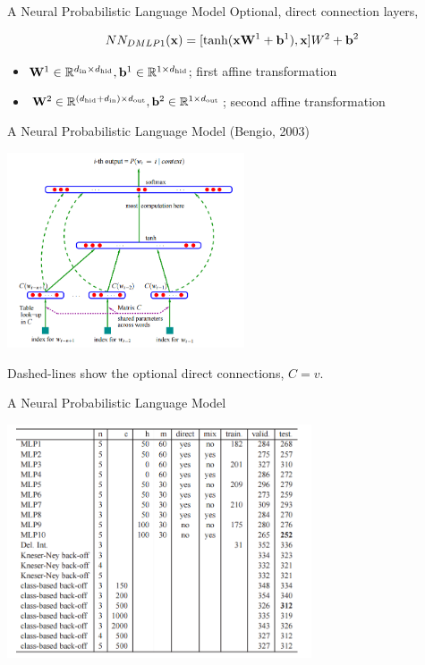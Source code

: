 \documentclass{beamer}
\begin{document}
\begin{frame}{A Neural Probabilistic Language Model }  
  Optional, direct connection layers,

  \[NN_{DMLP1}(\mathbf{x}) =  [\tanh(\mathbf{x}\mathbf{W}^1 + \mathbf{b}^1), \mathbf{x}] W^2 + \mathbf{b}^2\]

  \begin{itemize}
  \item $\mathbf{W}^1 \in \mathbb{R}^{{d_{\mathrm{in}}} \times {d_{\mathrm{hid}}}}, \mathbf{b}^1 \in \mathbb{R}^{1 \times {d_{\mathrm{hid}}}}$; first affine transformation
  \item $\mathbf{W}^2 \in \mathbb{R}^{({d_{\mathrm{hid}}} + {d_{\mathrm{in}}})  \times {d_{\mathrm{out}}}}, \mathbf{b}^2 \in \mathbb{R}^{1 \times {d_{\mathrm{out}}}}$; second affine transformation
  \end{itemize}
\end{frame}

\begin{frame}{A Neural Probabilistic Language Model (Bengio, 2003)}  
  \begin{center}
    \includegraphics[width=7cm]{bengio}
  \end{center}
  Dashed-lines show the optional direct connections, $C = v$.
\end{frame}



\begin{frame}{A Neural Probabilistic Language Model }  
  \begin{center}
    \includegraphics[width=9cm]{bengioresults}
  \end{center}
\end{frame}
\end{document}
